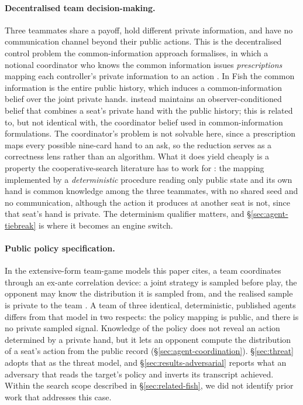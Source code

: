 \paragraph{Decentralised team decision-making.}
Three teammates share a payoff, hold different private information, and have no communication channel
beyond their public actions. This is the decentralised control problem the common-information
approach formalises, in which a notional coordinator who knows the common information issues
\emph{prescriptions} mapping each controller's private information to an action
\cite{nayyar2013common}. In Fish the common information is the entire public history, which
induces a common-information belief over the joint private hands. \sestina{} instead maintains an
observer-conditioned belief that combines a seat's private hand with the public history; this is
related to, but not identical with, the coordinator belief used in common-information formulations.
The coordinator's problem is not solvable here, since a prescription maps every possible nine-card hand to
an ask, so the reduction serves as a correctness lens rather than an algorithm. What it does yield
cheaply is a property the cooperative-search literature has to work for \cite{lerer2020sparta}: the
mapping implemented by a \emph{deterministic} procedure reading only public state and its own hand
is common knowledge among the three teammates, with no shared seed and no communication, although
the action it produces at another seat is not, since that seat's hand is private. The determinism
qualifier matters, and \S\ref{sec:agent-tiebreak} is where it becomes an engine switch.

\paragraph{Public policy specification.}
In the extensive-form team-game models this paper cites, a team coordinates through an ex-ante
correlation device: a joint strategy is sampled before play, the opponent may know the distribution
it is sampled from, and the realised sample is private to the team
\cite{celli-gatti,farina-collusion,zhang-tbdag}. A team of three identical, deterministic, published
agents differs from that model in two respects: the policy mapping is public, and there is no
private sampled signal. Knowledge of the policy does not reveal an action determined by a private
hand, but it lets an opponent compute the distribution of a seat's action from the public record
(\S\ref{sec:agent-coordination}). \S\ref{sec:threat} adopts that as the threat model, and
\S\ref{sec:results-adversarial} reports what an adversary that reads the target's policy and
inverts its transcript achieved. Within the search scope described in \S\ref{sec:related-fish}, we
did not identify prior work that addresses this case.

